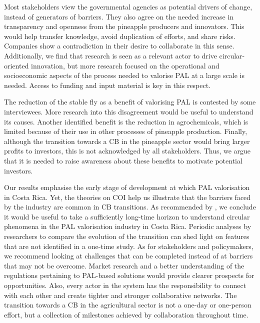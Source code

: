Most stakeholders view the governmental agencies as potential drivers of change, instead of generators of barriers. They also agree on the needed increase in transparency and openness from the pineapple producers and innovators. This would help transfer knowledge, avoid duplication of efforts, and share risks. Companies show a contradiction in their desire to collaborate in this sense. Additionally, we find that research is seen as a relevant actor to drive circular-oriented innovation, but more research focused on the operational and socioeconomic aspects of the process needed to valorise PAL at a large scale is needed. Access to funding and input material is key in this respect.

The reduction of the stable fly as a benefit of valorising PAL is contested by some interviewees. More research into this disagreement would be useful to understand its causes. Another identified benefit is the reduction in agrochemicals, which is limited because of their use in other processes of pineapple production. Finally, although the transition towards a CB in the pineapple sector would bring larger profits to investors, this is not acknowledged by all stakeholders. Thus, we argue that it is needed to raise awareness about these benefits to motivate potential investors. 

Our results emphasise the early stage of development at which PAL valorisation in Costa Rica. Yet, the theories on COI help us illustrate that the barriers faced by the industry are common in CB transitions. As recommended by \cite{blomsma2022making}, we conclude it would be useful to take a sufficiently long-time horizon to understand circular phenomena in the PAL valorisation industry in Costa Rica. Periodic analyses by researchers to compare the evolution of the transition can shed light on features that are not identified in a one-time study. As for stakeholders and policymakers, we recommend looking at challenges that can be completed instead of at barriers that may not be overcome. Market research and a better understanding of the regulations pertaining to PAL-based solutions would provide clearer prospects for opportunities. Also, every actor in the system has the responsibility to connect with each other and create tighter and stronger collaborative networks. The transition towards a CB in the agricultural sector is not a one-day or one-person effort, but a collection of milestones achieved by collaboration throughout time. 

